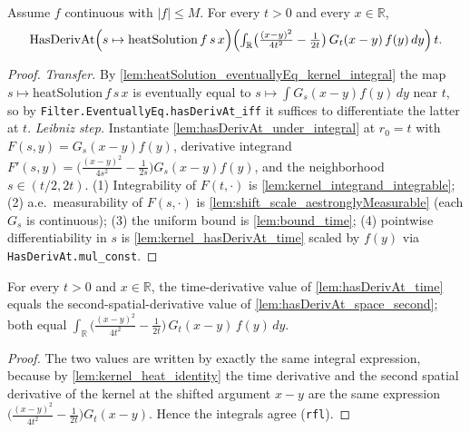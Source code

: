 \begin{lemma}
    \label{lem:hasDerivAt_time}
    \leanok
    Assume $f$ continuous with $\lvert f\rvert \le M$. For every $t > 0$ and every
    $x \in \mathbb{R}$,
    \[ \mathrm{HasDerivAt}\Bigl(s \mapsto \mathrm{heatSolution}\,f\,s\,x\Bigr)
       \Bigl(\textstyle\int_{\mathbb{R}} \bigl(\tfrac{(x-y)^2}{4t^2}-\tfrac{1}{2t}\bigr)\,
       G_t(x-y)\,f(y)\,dy\Bigr)\, t. \]
\end{lemma}
\begin{proof}
    \emph{Transfer.} By \cref{lem:heatSolution_eventuallyEq_kernel_integral} the map
    $s \mapsto \mathrm{heatSolution}\,f\,s\,x$ is eventually equal to
    $s \mapsto \int G_s(x-y) f(y)\,dy$ near $t$, so by
    \texttt{Filter.EventuallyEq.hasDerivAt\_iff} it suffices to differentiate the
    latter at $t$.
    \emph{Leibniz step.} Instantiate \cref{lem:hasDerivAt_under_integral} at $r_0 = t$
    with $F(s,y) = G_s(x-y) f(y)$, derivative integrand
    $F'(s,y) = \bigl(\tfrac{(x-y)^2}{4s^2}-\tfrac{1}{2s}\bigr) G_s(x-y) f(y)$, and the
    neighborhood $s \in (t/2, 2t)$. (1) Integrability of $F(t,\cdot)$ is
    \cref{lem:kernel_integrand_integrable}; (2) a.e.\ measurability of $F(s,\cdot)$ is
    \cref{lem:shift_scale_aestronglyMeasurable} (each $G_s$ is continuous); (3) the
    uniform bound is \cref{lem:bound_time}; (4) pointwise differentiability in $s$ is
    \cref{lem:kernel_hasDerivAt_time} scaled by $f(y)$ via \texttt{HasDerivAt.mul\_const}.
\end{proof}

\begin{lemma}
    \label{lem:time_eq_space_second}
    \leanok
    For every $t > 0$ and $x \in \mathbb{R}$, the time-derivative value of
    \cref{lem:hasDerivAt_time} equals the second-spatial-derivative value of
    \cref{lem:hasDerivAt_space_second}; both equal
    $\int_{\mathbb{R}} \bigl(\tfrac{(x-y)^2}{4t^2}-\tfrac{1}{2t}\bigr)\,G_t(x-y)\,f(y)\,dy$.
\end{lemma}
\begin{proof}
    The two values are written by exactly the same integral expression, because by
    \cref{lem:kernel_heat_identity} the time derivative and the second spatial
    derivative of the kernel at the shifted argument $x-y$ are the same expression
    $\bigl(\tfrac{(x-y)^2}{4t^2}-\tfrac{1}{2t}\bigr) G_t(x-y)$. Hence the integrals
    agree (\texttt{rfl}).
\end{proof}

